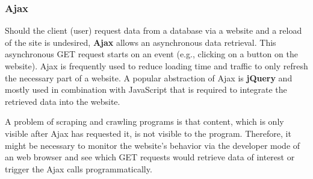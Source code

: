 \subsubsection{Ajax}
  Should the client (user) request data from a database via a website and a reload of the site is undesired, \textbf{Ajax} allows an asynchronous data retrieval.
  This asynchronous GET request starts on an event (e.g., clicking on a button on the website).
  Ajax is frequently used to reduce loading time and traffic to only refresh the necessary part of a website.
  A popular abstraction of Ajax is \textbf{jQuery} and mostly used in combination with JavaScript that is required to integrate the retrieved data into the website.

  A problem of scraping and crawling programs is that content, which is only visible after Ajax has requested it, is not visible to the program.
  Therefore, it might be necessary to monitor the website's behavior via the developer mode of an web browser and see which GET requests would retrieve data of interest or trigger the Ajax calls programmatically.

